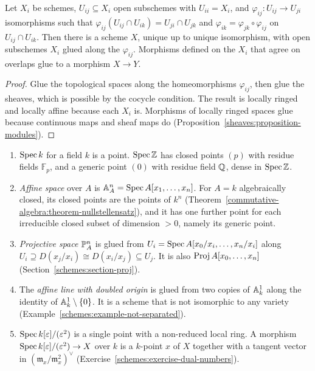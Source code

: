 \begin{proposition}\label{schemes:proposition-gluing}
Let $X_i$ be schemes, $U_{ij} \subseteq X_i$ open subschemes with $U_{ii} = X_i$, and $\varphi_{ij} \colon U_{ij} \to U_{ji}$ isomorphisms such that
$\varphi_{ij}(U_{ij} \cap U_{ik}) = U_{ji} \cap U_{jk}$ and $\varphi_{ik} = \varphi_{jk} \circ \varphi_{ij}$ on $U_{ij} \cap U_{ik}$. Then there is a scheme $X$,
unique up to unique isomorphism, with open subschemes $X_i$ glued along the $\varphi_{ij}$. Morphisms defined on the $X_i$ that agree on overlaps
glue to a morphism $X \to Y$.
\end{proposition}

\begin{proof}
Glue the topological spaces along the homeomorphisms $\varphi_{ij}$, then glue the sheaves, which is possible by the cocycle condition. The result is
locally ringed and locally affine because each $X_i$ is. Morphisms of locally ringed spaces glue because continuous maps and sheaf maps do
(Proposition~\ref{sheaves:proposition-modules}).
\end{proof}

\begin{example}\label{schemes:example-schemes}
\begin{enumerate}
\item $\operatorname{Spec} k$ for a field $k$ is a point. $\operatorname{Spec}\mathbb{Z}$ has closed points $(p)$ with residue fields $\mathbb{F}_p$, and a generic point $(0)$ with residue
field $\mathbb{Q}$, dense in $\operatorname{Spec}\mathbb{Z}$.
\item \emph{Affine space} over $A$ is $\mathbb{A}^n_A = \operatorname{Spec} A[x_1, \ldots, x_n]$. For $A = k$ algebraically closed, its closed points are the points of
$k^n$ (Theorem~\ref{commutative-algebra:theorem-nullstellensatz}), and it has one further point for each irreducible closed subset of dimension
$> 0$, namely its generic point.
\item \emph{Projective space} $\mathbb{P}^n_A$ is glued from $U_i = \operatorname{Spec} A[x_0/x_i, \ldots, x_n/x_i]$ along $U_i \supseteq D(x_j/x_i) \cong D(x_i/x_j) \subseteq U_j$. It is
also $\operatorname{Proj} A[x_0, \ldots, x_n]$ (Section~\ref{schemes:section-proj}).
\item The \emph{affine line with doubled origin} is glued from two copies of $\mathbb{A}^1_k$ along the identity of $\mathbb{A}^1_k \setminus \{0\}$. It is a scheme that is
not isomorphic to any variety (Example~\ref{schemes:example-not-separated}).
\item $\operatorname{Spec} k[\varepsilon]/(\varepsilon^2)$ is a single point with a non-reduced local ring. A morphism $\operatorname{Spec} k[\varepsilon]/(\varepsilon^2) \to X$ over $k$ is a
$k$-point $x$ of $X$ together with a tangent vector in $(\mathfrak{m}_x/\mathfrak{m}_x^2)^\vee$ (Exercise~\ref{schemes:exercise-dual-numbers}).
\end{enumerate}
\end{example}

